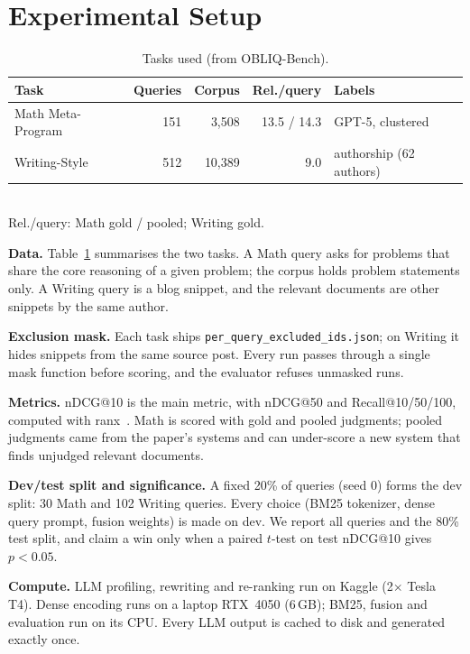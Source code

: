 \documentclass[conference]{IEEEtran}
\begin{document}
\section{Experimental Setup}

\begin{table}[t]
\centering
\caption{Tasks used (from OBLIQ-Bench).}
\label{tab:data}
\footnotesize
\begin{tabular}{@{}lrrrl@{}}
\toprule
Task & Queries & Corpus & Rel./query & Labels \\
\midrule
Math Meta-Program & 151 & 3,508 & 13.5 / 14.3 & GPT-5, clustered \\
Writing-Style & 512 & 10,389 & 9.0 & authorship (62 authors) \\
\bottomrule
\end{tabular}
\\[2pt]{\scriptsize Rel./query: Math gold / pooled; Writing gold.}
\end{table}

\textbf{Data.} Table~\ref{tab:data} summarises the two tasks. A Math query asks for problems that share the core reasoning of a given problem; the corpus holds problem statements only. A Writing query is a blog snippet, and the relevant documents are other snippets by the same author.

\textbf{Exclusion mask.} Each task ships \texttt{per\_query\_excluded\_ids.json}; on Writing it hides snippets from the same source post. Every run passes through a single mask function before scoring, and the evaluator refuses unmasked runs.

\textbf{Metrics.} nDCG@10 is the main metric, with nDCG@50 and Recall@10/50/100, computed with ranx~\cite{ranx}. Math is scored with gold and pooled judgments; pooled judgments came from the paper's systems and can under-score a new system that finds unjudged relevant documents.

\textbf{Dev/test split and significance.} A fixed 20\% of queries (seed 0) forms the dev split: 30 Math and 102 Writing queries. Every choice (BM25 tokenizer, dense query prompt, fusion weights) is made on dev. We report all queries and the 80\% test split, and claim a win only when a paired $t$-test on test nDCG@10 gives $p<0.05$.

\textbf{Compute.} LLM profiling, rewriting and re-ranking run on Kaggle (2$\times$ Tesla T4). Dense encoding runs on a laptop RTX~4050 (6\,GB); BM25, fusion and evaluation run on its CPU. Every LLM output is cached to disk and generated exactly once.
\end{document}

